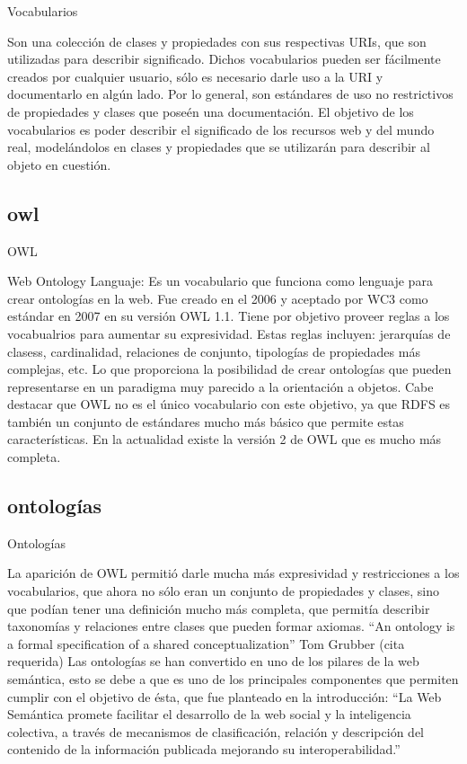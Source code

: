 Vocabularios

Son una colección de clases y propiedades con sus respectivas URIs, que son utilizadas para describir significado. Dichos vocabularios 
pueden ser fácilmente creados por cualquier usuario, sólo es necesario darle uso a la URI y documentarlo en algún lado. 
Por lo general, son estándares de uso no restrictivos de propiedades y clases que poseén una documentación.
El objetivo de los vocabularios es poder describir el significado de los recursos web y del mundo real, modelándolos en clases y 
propiedades que se utilizarán para describir al objeto en cuestión.

\subsection{owl}

OWL

Web Ontology Languaje: Es un vocabulario que funciona como lenguaje para crear ontologías en la web. Fue creado en el 2006 y aceptado 
por WC3 como estándar en 2007 en su versión OWL 1.1. Tiene por objetivo proveer reglas a los vocabualrios para aumentar su expresividad. 
Estas reglas incluyen: jerarquías de clasess, cardinalidad, relaciones de conjunto, tipologías de propiedades más complejas, etc. Lo que proporciona la posibilidad de crear ontologías que pueden 
representarse en un paradigma muy parecido a la orientación a objetos. Cabe destacar que OWL no es el único vocabulario con este objetivo, ya que RDFS 
es también un conjunto de estándares mucho más básico que permite estas características.
En la actualidad existe la versión 2 de OWL que es mucho más completa.

\subsection{ontologías}

Ontologías

La aparición de OWL permitió darle mucha más expresividad y restricciones a los vocabularios, que ahora no sólo eran un conjunto de 
propiedades y clases, sino que podían tener una definición mucho más completa, que permitía describir taxonomías y relaciones entre clases que pueden formar axiomas.
``An ontology is a formal specification of a shared conceptualization'' Tom Grubber (cita requerida)
Las ontologías se han convertido en uno de los pilares de la web semántica, esto se debe a que es uno de los principales componentes que permiten 
cumplir con el objetivo de ésta, que fue planteado en la introducción: ``La Web Semántica promete facilitar el desarrollo de la web social y la inteligencia colectiva, a través de mecanismos de clasificación, relación y descripción del contenido de la información publicada mejorando su interoperabilidad.''

